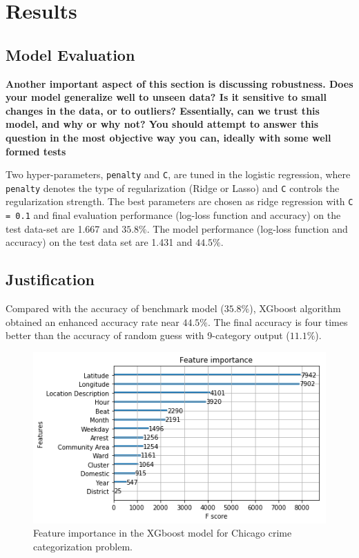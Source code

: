 \documentclass[12pt]{article}
\begin{document}
\section{Results}
\subsection{Model Evaluation}

\textbf{Another important aspect of this section is discussing robustness. Does your model generalize well to unseen data? Is it sensitive to small changes in the data, or to outliers? Essentially, can we trust this model, and why or why not? You should attempt to answer this question in the most objective way you can, ideally with some well formed tests}

Two hyper-parameters, \verb|penalty| and \verb|C|, are tuned in the logistic regression, where \verb|penalty| denotes the type of regularization (Ridge or Lasso) and \verb|C| controls the regularization strength. The best parameters are chosen as ridge regression with \verb|C = 0.1| and final evaluation performance (log-loss function and accuracy) on the test data-set are 1.667 and $35.8\%$.
The model performance (log-loss function and accuracy) on the test data set are 1.431 and $44.5\%$.

\subsection{Justification}
Compared with the accuracy of benchmark model ($35.8\%$), XGboost algorithm obtained an enhanced accuracy rate near $44.5\%$. The final accuracy is four times better than the accuracy of random guess with 9-category output ($11.1\%$). 

\begin{figure}[ht]
\includegraphics[scale=0.8]{figure/feature_importance.png}
\centering
\caption{Feature importance in the XGboost model for Chicago crime categorization problem.}
\label{fig:xgboost}
\end{figure}
\end{document}
